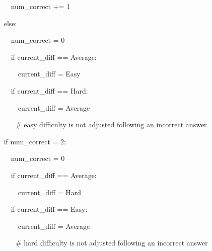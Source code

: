 $\quad\quad$ num\_correct += 1

$\quad$ else:

$\quad\quad$ num\_correct = 0

$\quad\quad$ if current\_diff == Average:

$\quad\quad\quad$ current\_diff = Easy

$\quad\quad$ if current\_diff == Hard:

$\quad\quad\quad$ current\_diff = Average

$\quad\quad\quad$\# easy difficulty is not adjusted following an incorrect answer

$\quad$ if num\_correct = 2:

$\quad\quad$ num\_correct = 0

$\quad\quad$ if current\_diff == Average:

$\quad\quad\quad$ current\_diff = Hard

$\quad\quad$ if current\_diff == Easy:

$\quad\quad\quad$ current\_diff = Average

$\quad\quad\quad$\# hard difficulty is not adjusted following an incorrect answer
